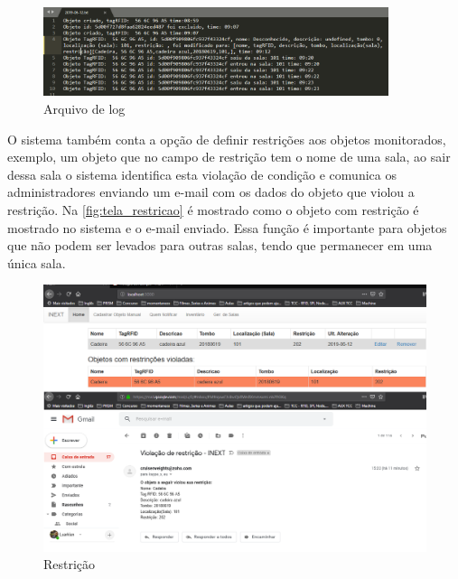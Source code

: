\begin{figure}[H]
              \caption{\label{fig:tela_log}Arquivo de log}
              \centering
              \includegraphics[width=0.9\textwidth]{Figuras/tela_logs.png}
\end{figure}
\par
O sistema também conta a opção de definir restrições aos objetos monitorados, exemplo, um objeto que no campo de restrição tem o nome de uma sala, ao sair dessa sala o sistema identifica esta violação de condição e comunica os administradores enviando um e-mail com os dados do objeto que violou a restrição. Na \autoref{fig:tela_restricao} é mostrado como o objeto com restrição é mostrado no sistema e o e-mail enviado. Essa função é importante para objetos que não podem ser levados para outras salas, tendo que permanecer em uma única sala. 
\begin{figure}[H]
              \caption{\label{fig:tela_restricao}Restrição}
              \centering
              \includegraphics[width=1\textwidth]{Figuras/tela_restricao.png}
\end{figure}


